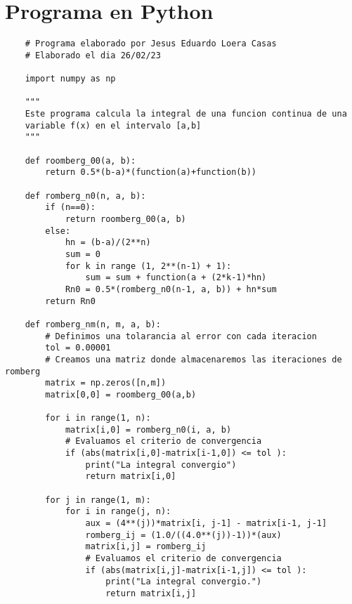 \section{Programa en Python}


\begin{lstlisting}
    # Programa elaborado por Jesus Eduardo Loera Casas
    # Elaborado el dia 26/02/23
     
    import numpy as np
    
    """
    Este programa calcula la integral de una funcion continua de una 
    variable f(x) en el intervalo [a,b]
    """
    
    def roomberg_00(a, b):
        return 0.5*(b-a)*(function(a)+function(b))
    
    def romberg_n0(n, a, b):
        if (n==0):
            return roomberg_00(a, b)
        else:
            hn = (b-a)/(2**n)
            sum = 0
            for k in range (1, 2**(n-1) + 1):
                sum = sum + function(a + (2*k-1)*hn)
            Rn0 = 0.5*(romberg_n0(n-1, a, b)) + hn*sum
        return Rn0
    
    def romberg_nm(n, m, a, b):
        # Definimos una tolarancia al error con cada iteracion
        tol = 0.00001
        # Creamos una matriz donde almacenaremos las iteraciones de romberg
        matrix = np.zeros([n,m])
        matrix[0,0] = roomberg_00(a,b)
        
        for i in range(1, n):
            matrix[i,0] = romberg_n0(i, a, b)
            # Evaluamos el criterio de convergencia
            if (abs(matrix[i,0]-matrix[i-1,0]) <= tol ):
                print("La integral convergio")
                return matrix[i,0]
    
        for j in range(1, m):
            for i in range(j, n):
                aux = (4**(j))*matrix[i, j-1] - matrix[i-1, j-1]
                romberg_ij = (1.0/((4.0**(j))-1))*(aux)
                matrix[i,j] = romberg_ij
                # Evaluamos el criterio de convergencia
                if (abs(matrix[i,j]-matrix[i-1,j]) <= tol ):
                    print("La integral convergio.")
                    return matrix[i,j]
    

\end{lstlisting}

